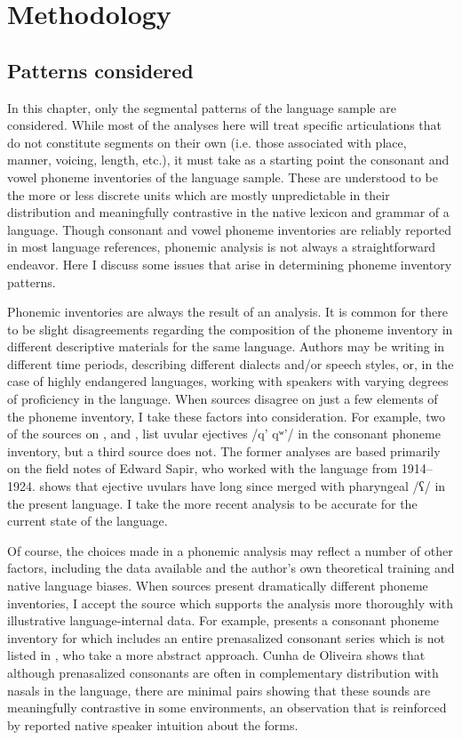 \section{Methodology}\label{sec:4.2}
\subsection{Patterns considered}\label{sec:4.2.1}

  In this chapter, only the segmental patterns of the language sample are considered. While most of the analyses here will treat specific articulations that do not constitute segments on their own (i.e. those associated with place, manner, voicing, length, etc.), it must take as a starting point the consonant and vowel phoneme inventories of the language sample. These are understood to be the more or less discrete units which are mostly unpredictable in their distribution and meaningfully contrastive in the native lexicon and grammar of a language. Though consonant and vowel phoneme inventories are reliably reported in most language references, phonemic analysis is not always a straightforward endeavor. Here I discuss some issues that arise in determining phoneme inventory patterns.

  Phonemic inventories are always the result of an analysis. It is common for there to be slight disagreements regarding the composition of the phoneme inventory in different descriptive materials for the same language. Authors may be writing in different time periods, describing different dialects and/or speech styles, or, in the case of highly endangered languages, working with speakers with varying degrees of proficiency in the language. When sources disagree on just a few elements of the phoneme inventory, I take these factors into consideration. For example, two of the sources on , \citet{Stonham1999} and \citet{Davidson2002}, list uvular ejectives /q’ qʷ’/ in the consonant phoneme inventory, but a third source \citep{Kim2003} does not. The former analyses are based primarily on the field notes of Edward Sapir, who worked with the language from 1914--1924. \citet{Kim2003} shows that ejective uvulars have long since merged with pharyngeal /ʕ/ in the present language. I take the more recent analysis to be accurate for the current state of the language. 

  Of course, the choices made in a phonemic analysis may reflect a number of other factors, including the data available and the author’s own theoretical training and native language biases. When sources present dramatically different phoneme inventories, I accept the source which supports the analysis more thoroughly with illustrative language-internal data. For example, \citet{CunhadeOliveira2005} presents a consonant phoneme inventory for  which includes an entire prenasalized consonant series which is not listed in \citet{BurgessHam1968}, who take a more abstract approach. Cunha de Oliveira shows that although prenasalized consonants are often in complementary distribution with nasals in the language, there are minimal pairs showing that these sounds are meaningfully contrastive in some environments, an observation that is reinforced by reported native speaker intuition about the forms.

